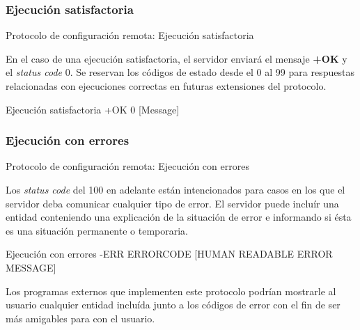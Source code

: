 \documentclass{beamer}
\begin{document}
\subsubsection{Ejecución satisfactoria}

\begin{frame}{Protocolo de configuración remota: Ejecución satisfactoria}

\par En el caso de una ejecución satisfactoria, el servidor enviará el mensaje \textbf{+OK} y el \textit{status code} 0. Se reservan los códigos de estado desde el 0 al 99 para respuestas relacionadas con ejecuciones correctas en futuras extensiones del protocolo.

\begin{block}{Ejecución satisfactoria}
+OK 0 [Message]
\end{block}

\end{frame}

\subsubsection{Ejecución con errores}

\begin{frame}{Protocolo de configuración remota: Ejecución con errores}

\par Los \textit{status code} del 100 en adelante están intencionados para casos en los que el servidor deba comunicar cualquier tipo de error. El servidor puede incluír una entidad conteniendo una explicación de la situación de error e informando si ésta es una situación permanente o temporaria.\\

\begin{block}{Ejecución con errores}
-ERR ERROR\textunderscore CODE [HUMAN READABLE ERROR MESSAGE]
\end{block}


\par Los programas externos que implementen este protocolo podrían mostrarle al usuario cualquier entidad incluída junto a los códigos de error con el fin de ser más amigables para con el usuario.\\

\end{frame}
\end{document}
